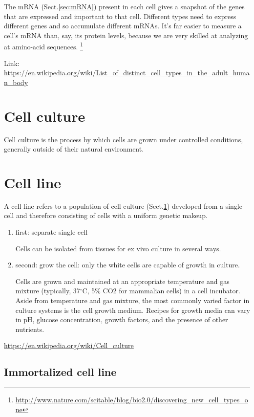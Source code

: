 The mRNA (Sect.\ref{sec:mRNA}) present in each cell gives a snapshot of the
genes that are expressed and important to that cell. Different types need to
express different genes and so accumulate different mRNAs. It's far easier to
measure a cell's mRNA than, say, its protein levels, because we are very skilled
at analyzing at amino-acid sequences.
\footnote{\url{http://www.nature.com/scitable/blog/bio2.0/discovering_new_cell_types_one}}


Link:
\url{https://en.wikipedia.org/wiki/List_of_distinct_cell_types_in_the_adult_human_body}


\section{Cell culture}
\label{sec:cell-culture}

Cell culture is the process by which cells are grown under controlled
conditions, generally outside of their natural environment.

\section{Cell line}
\label{sec:cell-line}

A cell line refers to a population of cell culture (Sect.\ref{sec:cell-culture}) developed from a single cell and
therefore consisting of cells with a uniform genetic makeup.
\begin{enumerate}
  \item first: separate single cell

Cells can be isolated from tissues for ex vivo culture in several ways.
  
  \item second: grow the cell: only the white cells are capable of growth in
  culture.
  
Cells are grown and maintained at an appropriate temperature and gas mixture
(typically, 37$^\circ$C, 5\% CO2 for mammalian cells) in a cell incubator.
Aside from temperature and gas mixture, the most commonly varied factor in
culture systems is the cell growth medium. Recipes for growth media can vary in
pH, glucose concentration, growth factors, and the presence of other nutrients.

\end{enumerate}
\url{https://en.wikipedia.org/wiki/Cell_culture}

\subsection{Immortalized cell line}

